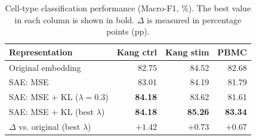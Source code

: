\begin{table}[!htbp]
  \caption{Cell-type classification performance (Macro-F1, \%). The best value in each column is shown in bold. $\Delta$ is measured in percentage points (pp).}
  \label{tab:classification}
  \centering
  \small
  \setlength{\tabcolsep}{5pt}
  \renewcommand{\arraystretch}{1.15}
  \begin{tabular*}{\linewidth}{@{\extracolsep{\fill}}lrrr@{}}
    \toprule
    Representation & Kang ctrl & Kang stim & PBMC \\
    \midrule
    Original embedding & 82.75 & 84.52 & 82.68 \\
    SAE: MSE & 83.01 & 84.19 & 81.79 \\
    SAE: MSE + KL ($\lambda=0.3$) & \textbf{84.18} & 83.62 & 81.61 \\
    SAE: MSE + KL (best $\lambda$) & \textbf{84.18} & \textbf{85.26} & \textbf{83.34} \\
    \midrule
    $\Delta$ vs. original (best $\lambda$) & $+1.42$ & $+0.73$ & $+0.67$ \\
    \bottomrule
  \end{tabular*}
\end{table}
